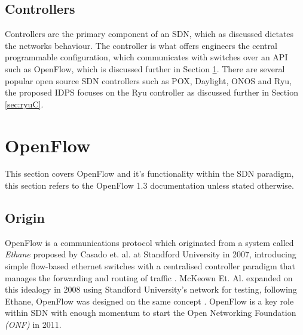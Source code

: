 \documentclass[12pt, oneside]{book}
\begin{document}
\subsection{Controllers} %
Controllers are the primary component of an SDN, which as discussed dictates the networks behaviour.
The controller is what offers engineers the central programmable configuration, which communicates with switches over an 
API such as OpenFlow, \cite{mckeown2008openflow} which is discussed further in Section \ref{sec:openflow}.
There are several popular open source SDN controllers such as POX\cite{noxrepo_2012}, Daylight\cite{khattak2014performance},
ONOS\cite{berde2014onos} and Ryu\cite{ryusdnframework}, the proposed IDPS focuses on the Ryu controller as
discussed further in Section \ref{sec:ryuC}.


\section{OpenFlow}
\label{sec:openflow}
This section covers OpenFlow and it's functionality within the SDN paradigm, this section refers to the
OpenFlow 1.3 documentation unless stated otherwise\cite{openflow}.

\subsection{Origin}
OpenFlow is a communications protocol which originated from a system called \emph{Ethane} proposed by Casado et. al.
at Standford University in 2007,
introducing simple flow-based ethernet switches with a centralised controller paradigm that manages the
forwarding and routing of traffic \cite{casado2007ethane}.
McKeown Et. Al. expanded on this idealogy in 2008 using Standford University’s network for testing, following Ethane, OpenFlow
was designed on the same concept \cite{mckeown2008openflow}. OpenFlow is a key role within SDN with enough momentum
to start the Open Networking Foundation \emph{(ONF)} in 2011\cite{openNF}.
\end{document}
